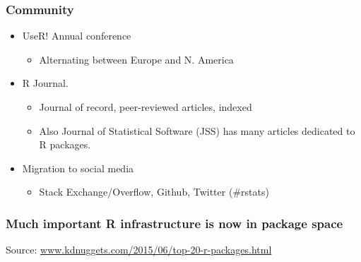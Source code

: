 \documentclass[svgnames]{beamer}
\begin{document}
\begin{frame}
  \frametitle{Community}
  \begin{itemize}
  \item UseR! Annual conference
    \begin{itemize}
    \item Alternating between Europe and N. America
    \end{itemize}
  \item R Journal.
    \begin{itemize}
    \item Journal of record, peer-reviewed articles, indexed
    \item Also Journal of Statistical Software (JSS) has many articles
      dedicated to R packages.
    \end{itemize}
  \item Migration to social media
    \begin{itemize}
    \item Stack Exchange/Overflow, Github, Twitter (\#rstats)
    \end{itemize}
  \end{itemize}
\end{frame}

\begin{frame}
  \frametitle{Much important R infrastructure is now in package space}

  \begin{center}
  {\tiny Source: \url{www.kdnuggets.com/2015/06/top-20-r-packages.html}}
  \end{center}
    
\end{frame}
\end{document}

